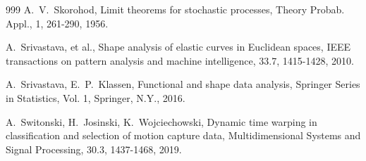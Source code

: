 \documentclass[12pt]{amsart}
\begin{document}
\begin{thebibliography}{999}
A.~V.~Skorohod, 
Limit theorems for stochastic processes, 
Theory Probab. Appl., 1, 261-290, 1956.

A.~Srivastava, et al., 
Shape analysis of elastic curves in Euclidean spaces, 
IEEE transactions on pattern analysis and machine intelligence, 33.7, 1415-1428, 2010.

A.~Srivastava, E.~P.~Klassen, 
Functional and shape data analysis, 
Springer Series in Statistics, Vol. 1, Springer, N.Y., 2016.

A.~Switonski, H.~Josinski, K.~Wojciechowski,
Dynamic time warping in classification and selection of motion capture data, 
Multidimensional Systems and Signal Processing, 30.3, 1437-1468, 2019.


\end{thebibliography}
\end{document}
